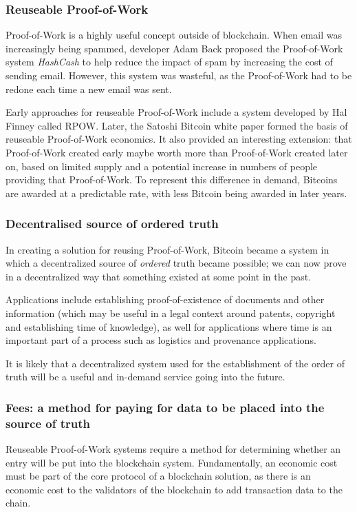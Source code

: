 \documentclass[a4paper,12pt]{article}
\begin{document}
\subsubsection{Reuseable Proof-of-Work}
Proof-of-Work is a highly useful concept outside of blockchain. When email was increasingly being spammed, developer Adam Back proposed the Proof-of-Work system \textit{HashCash} to help reduce the impact of spam by increasing the cost of sending email. However, this system was wasteful, as the Proof-of-Work had to be redone each time a new email was sent.

Early approaches for reuseable Proof-of-Work include a system developed by Hal Finney called RPOW\cite{reusablePoW}. Later, the Satoshi Bitcoin white paper \cite{SatoshiPaper} formed the basis of reuseable Proof-of-Work economics. It also provided an interesting extension: that Proof-of-Work created early maybe worth more than Proof-of-Work created later on, based on limited supply and a potential increase in numbers of people providing that Proof-of-Work. To represent this difference in demand, Bitcoins are awarded at a predictable rate, with less Bitcoin being awarded in later years. 

\subsubsection{Decentralised source of ordered truth}
In creating a solution for reusing Proof-of-Work, Bitcoin became a system in which a decentralized source of \textit{ordered} truth became possible; we can now prove in a decentralized way that something existed at some point in the past.

Applications include establishing proof-of-existence of documents and other information (which may be useful in a legal context around patents, copyright and establishing time of knowledge), as well for applications where time is an important part of a process such as logistics and provenance applications.

It is likely that a decentralized system used for the establishment of the order of truth will be a useful and in-demand service going into the future. 

\subsubsection{Fees: a method for paying for data to be placed into the source of truth}
Reuseable Proof-of-Work systems require a method for determining whether an entry will be put into the blockchain system. Fundamentally, an economic cost must be part of the core protocol of a blockchain solution, as there is an economic cost to the validators of the blockchain to add transaction data to the chain. 
\end{document}
